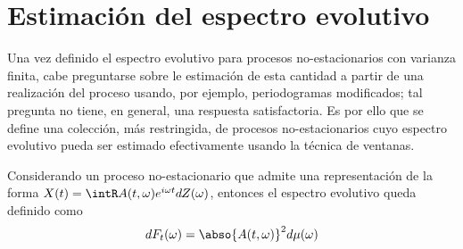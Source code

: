 %


\section{Estimación del espectro evolutivo}

Una vez definido el espectro evolutivo para procesos no-estacionarios con varianza finita, cabe 
preguntarse sobre le estimación de esta cantidad a partir de una realización del proceso usando, 
por ejemplo, periodogramas modificados; tal pregunta no tiene, en general, una respuesta 
satisfactoria.
Es por ello que se define una colección, más restringida, de procesos no-estacionarios cuyo 
espectro evolutivo pueda ser estimado efectivamente usando la técnica de ventanas.

Considerando un proceso no-estacionario \xt que admite una representación de la forma 
$X(t) = \intR A(t,\omega) e^{i \omega t} dZ(\omega)$, entonces el espectro evolutivo queda definido 
como
\begin{equation}
dF_t(\omega) = \abso{A(t,\omega)}^{2} d\mu(\omega)
\label{esp_evolutivo}
\end{equation}

